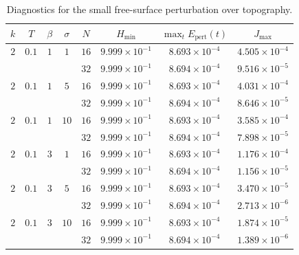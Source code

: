 \documentclass[pdflatex,sn-mathphys-num]{sn-jnl}%
\theoremstyle{thmstyleone}%
\theoremstyle{thmstyletwo}%
\theoremstyle{thmstylethree}%
\begin{document}
\begin{table}[htbp]
\centering
\caption{Diagnostics for the small free-surface perturbation over topography.}
\label{tab7}
\begin{tabular}{cccccccc}
\toprule
$k$ & $T$ & $\beta$ & $\sigma$ & $N$ & $H_{\min}$ & $\max_t E_{\mathrm{pert}}(t)$ & $J_{\max}$ \\
\midrule
$2$ & $0.1$ & $1$ & $1$ & $16$ & $9.999 \times 10^{-1}$ & $8.693 \times 10^{-4}$ & $4.505 \times 10^{-4}$\\
 &  &  &  & $32$ & $9.999 \times 10^{-1}$ & $8.694 \times 10^{-4}$ & $9.516 \times 10^{-5}$\\
$2$ & $0.1$ & $1$ & $5$ & $16$ & $9.999 \times 10^{-1}$ & $8.693 \times 10^{-4}$ & $4.031 \times 10^{-4}$\\
 &  &  &  & $32$ & $9.999 \times 10^{-1}$ & $8.694 \times 10^{-4}$ & $8.646 \times 10^{-5}$\\
$2$ & $0.1$ & $1$ & $10$ & $16$ & $9.999 \times 10^{-1}$ & $8.693 \times 10^{-4}$ & $3.585 \times 10^{-4}$\\
 &  &  &  & $32$ & $9.999 \times 10^{-1}$ & $8.694 \times 10^{-4}$ & $7.898 \times 10^{-5}$\\
$2$ & $0.1$ & $3$ & $1$ & $16$ & $9.999 \times 10^{-1}$ & $8.693 \times 10^{-4}$ & $1.176 \times 10^{-4}$\\
 &  &  &  & $32$ & $9.999 \times 10^{-1}$ & $8.694 \times 10^{-4}$ & $1.156 \times 10^{-5}$\\
$2$ & $0.1$ & $3$ & $5$ & $16$ & $9.999 \times 10^{-1}$ & $8.693 \times 10^{-4}$ & $3.470 \times 10^{-5}$\\
 &  &  &  & $32$ & $9.999 \times 10^{-1}$ & $8.694 \times 10^{-4}$ & $2.713 \times 10^{-6}$\\
$2$ & $0.1$ & $3$ & $10$ & $16$ & $9.999 \times 10^{-1}$ & $8.693 \times 10^{-4}$ & $1.874 \times 10^{-5}$\\
 &  &  &  & $32$ & $9.999 \times 10^{-1}$ & $8.694 \times 10^{-4}$ & $1.389 \times 10^{-6}$\\
\bottomrule
\end{tabular}
\end{table}
\end{document}
